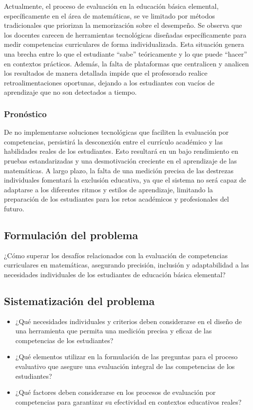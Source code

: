 Actualmente, el proceso de evaluación en la educación básica elemental, específicamente en el área de matemáticas, se ve limitado por métodos tradicionales que priorizan la memorización sobre el desempeño. Se observa que los docentes carecen de herramientas tecnológicas diseñadas específicamente para medir competencias curriculares de forma individualizada. Esta situación genera una brecha entre lo que el estudiante ``sabe'' teóricamente y lo que puede ``hacer'' en contextos prácticos. Además, la falta de plataformas que centralicen y analicen los resultados de manera detallada impide que el profesorado realice retroalimentaciones oportunas, dejando a los estudiantes con vacíos de aprendizaje que no son detectados a tiempo.

\subsubsection*{Pronóstico}

De no implementarse soluciones tecnológicas que faciliten la evaluación por competencias, persistirá la desconexión entre el currículo académico y las habilidades reales de los estudiantes. Esto resultará en un bajo rendimiento en pruebas estandarizadas y una desmotivación creciente en el aprendizaje de las matemáticas. A largo plazo, la falta de una medición precisa de las destrezas individuales fomentará la exclusión educativa, ya que el sistema no será capaz de adaptarse a los diferentes ritmos y estilos de aprendizaje, limitando la preparación de los estudiantes para los retos académicos y profesionales del futuro.

\subsection{Formulación del problema}

¿Cómo superar los desafíos relacionados con la evaluación de competencias curriculares en matemáticas, asegurando precisión, inclusión y adaptabilidad a las necesidades individuales de los estudiantes de educación básica elemental?

\subsection{Sistematización del problema}

\begin{itemize}[leftmargin=*]
  \item ¿Qué necesidades individuales y criterios deben considerarse en el diseño de una herramienta que permita una medición precisa y eficaz de las competencias de los estudiantes?
  \item ¿Qué elementos utilizar en la formulación de las preguntas para el proceso evaluativo que asegure una evaluación integral de las competencias de los estudiantes?
  \item ¿Qué factores deben considerarse en los procesos de evaluación por competencias para garantizar su efectividad en contextos educativos reales?
\end{itemize}

